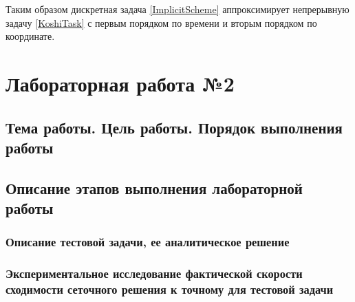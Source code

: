 \documentclass[a4paper,14pt,russian, fleqn]{extreport}
\begin{document}
 	Таким образом дискретная задача \eqref{ImplicitScheme} аппроксимирует непрерывную задачу \eqref{KoshiTask} с первым порядком по времени и вторым порядком по координате.
	\chapter{Лабораторная работа №2}
	\section{Тема работы. Цель работы. Порядок выполнения работы}
	\section{Описание этапов выполнения лабораторной работы}
	\subsection{Описание тестовой задачи, ее аналитическое решение}
	\subsection{Экспериментальное исследование фактической скорости сходимости сеточного решения к точному для тестовой задачи}
\end{document}
